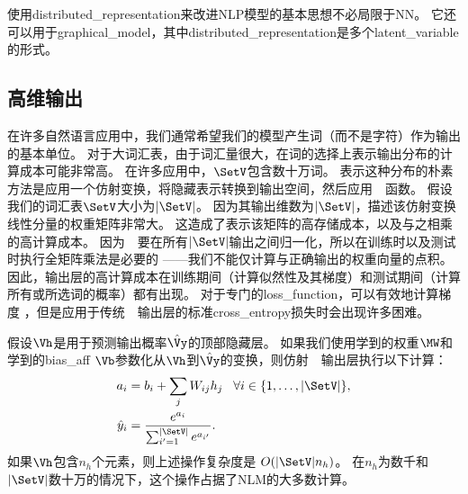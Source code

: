 
使用\gls{distributed_representation}来改进\gls{NLP}模型的基本思想不必局限于\gls{NN}。
它还可以用于\gls{graphical_model}，其中\gls{distributed_representation}是多个\gls{latent_variable}的形式\citep{Mnih+Hinton-2007}。

\subsection{高维输出}
\label{sec:high_dimensional_outputs}

在许多自然语言应用中，我们通常希望我们的模型产生词（而不是字符）作为输出的基本单位。
对于大词汇表，由于词汇量很大，在词的选择上表示输出分布的计算成本可能非常高。
在许多应用中，$\SetV$包含数十万词。
表示这种分布的朴素方法是应用一个仿射变换，将隐藏表示转换到输出空间，然后应用~~函数。
假设我们的词汇表$\SetV$大小为$| \SetV |$。
因为其输出维数为$| \SetV |$，描述该仿射变换线性分量的权重矩阵非常大。
这造成了表示该矩阵的高存储成本，以及与之相乘的高计算成本。
因为~~要在所有$| \SetV |$输出之间归一化，所以在训练时以及测试时执行全矩阵乘法是必要的 ——我们不能仅计算与正确输出的权重向量的点积。
因此，输出层的高计算成本在训练期间（计算似然性及其梯度）和测试期间（计算所有或所选词的概率）都有出现。
对于专门的\gls{loss_function}，可以有效地计算梯度 \citep{Vincent2015}，但是应用于传统~~输出层的标准\gls{cross_entropy}损失时会出现许多困难。

假设$\Vh$是用于预测输出概率$\hat \Vy$的顶部隐藏层。
如果我们使用学到的权重$\MW$和学到的\gls{bias_aff} $\Vb$参数化从$\Vh$到$\hat \Vy$的变换，则仿射~~输出层执行以下计算：
\begin{align}
\label{eq:softmax-over-words}
  a_i &= b_i + \sum_j  W_{ij} h_j \;\;\; \forall i \in \{1,\ldots,|\SetV|\}, \\
  \hat{y}_i &= \frac{e^{a_i}}{\sum_{i'=1}^{|\SetV|} e^{a_{i'}}}.
\end{align}
如果$\Vh$包含$n_h$个元素，则上述操作复杂度是 $O(|\SetV| n_h)$。
在$n_h$为数千和$| \SetV |$数十万的情况下，这个操作占据了\gls{NLM}的大多数计算。


